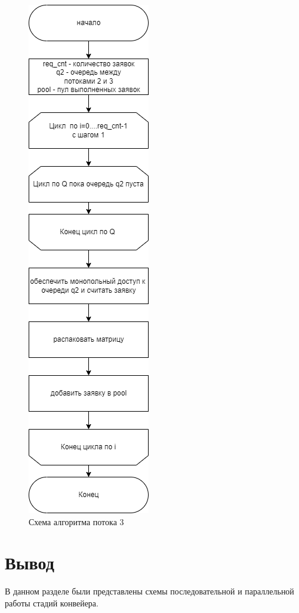 \begin{figure}[h]
	\centering
	\includegraphics[height=0.8\textheight]{img/unpack.png}
	\caption{Схема алгоритма потока 3}
	\label{fig:unpack}
\end{figure}

\clearpage

\section*{Вывод}
В данном разделе были представлены схемы последовательной и параллельной работы стадий конвейера.